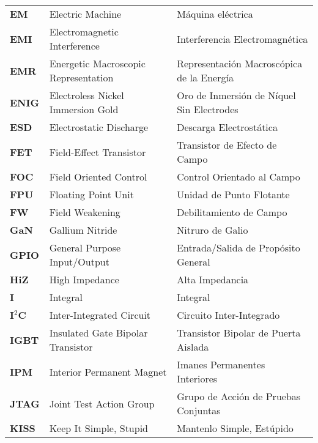 \begin{longtable}{>{\bfseries}p{3cm} p{5cm} p{5cm}}
\textbf{EM} & Electric Machine & Máquina eléctrica \\

\textbf{EMI} & Electromagnetic Interference & Interferencia Electromagnética \\

\textbf{EMR} & Energetic Macroscopic Representation & Representación Macroscópica de la Energía \\

\textbf{ENIG} & Electroless Nickel Immersion Gold & Oro de Inmersión de Níquel Sin Electrodes \\

\textbf{ESD} & Electrostatic Discharge & Descarga Electrostática \\

\textbf{FET} & Field-Effect Transistor & Transistor de Efecto de Campo  \\

\textbf{FOC} & Field Oriented Control & Control Orientado al Campo \\

\textbf{FPU} & Floating Point Unit & Unidad de Punto Flotante \\

\textbf{FW} & Field Weakening & Debilitamiento de Campo \\

\textbf{GaN} & Gallium Nitride & Nitruro de Galio \\

\textbf{GPIO} & General Purpose Input/Output & Entrada/Salida de Propósito General \\

\textbf{HiZ} & High Impedance & Alta Impedancia \\

\textbf{I} & Integral & Integral \\

\textbf{I$^2$C} & Inter-Integrated Circuit & Circuito Inter-Integrado \\

\textbf{IGBT} & Insulated Gate Bipolar Transistor & Transistor Bipolar de Puerta Aislada \\

\textbf{IPM} & Interior Permanent Magnet & Imanes Permanentes Interiores \\

\textbf{JTAG} & Joint Test Action Group & Grupo de Acción de Pruebas Conjuntas \\

\textbf{KISS} & Keep It Simple, Stupid & Mantenlo Simple, Estúpido \\


\end{longtable}
